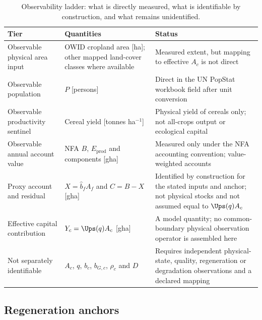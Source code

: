 \begin{table}[htbp]
\centering\small
\caption{Observability ladder: what is directly measured, what is identifiable by construction, and what remains unidentified.}
\label{tab:si_ladder}
\begin{tabularx}{\textwidth}{>{\raggedright\arraybackslash}p{} X >{\raggedright\arraybackslash}p{}}
\toprule
Tier & Quantities & Status \\
\midrule
Observable physical area input & OWID cropland area [ha]; other mapped land-cover classes where available & Measured extent, but mapping to effective $A_c$ is not direct \\
Observable population & $P$ [persons] & Direct in the UN PopStat workbook field after unit conversion \\
Observable productivity sentinel & Cereal yield [tonnes ha$^{-1}$] & Physical yield of cereals only; not all-crops output or ecological capital \\
Observable annual account value & NFA $B$, $E_{\mathrm{prod}}$ and components [gha] & Measured only under the NFA accounting convention; value-weighted accounts \\
Proxy account and residual & $X=\hat b_fA_f$ and $C=B-X$ [gha] & Identified by construction for the stated inputs and anchor; not physical stocks and not assumed equal to $\Ups(q)A_c$ \\
Effective capital contribution & $Y_c=\Ups(q)A_c$ [gha] & A model quantity; no common-boundary physical observation operator is assembled here \\
Not separately identifiable & $A_c$, $q$, $b_c$, $b_{G,c}$, $\rho_c$ and $D$ & Requires independent physical-state, quality, regeneration or degradation observations and a declared mapping \\
\bottomrule
\end{tabularx}
\end{table}

\subsection{Regeneration anchors}\label{si:anchors}

